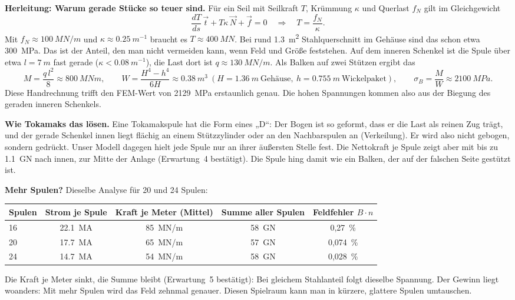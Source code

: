 \textbf{Herleitung: Warum gerade Stücke so teuer sind.} Für ein Seil mit Seilkraft $T$, Krümmung $\kappa$ und
Querlast $f_N$ gilt im Gleichgewicht
\[
\frac{dT}{ds}\,\vec t + T\kappa\,\vec N + \vec f = 0 \quad\Rightarrow\quad T = \frac{f_N}{\kappa}.
\]
Mit $f_N \approx \SI{100}{MN/m}$ und $\kappa \approx \SI{0,25}{m^{-1}}$ braucht es $T \approx \SI{400}{MN}$. Bei rund
\SI{1,3}{m^2} Stahlquerschnitt im Gehäuse sind das schon etwa \SI{300}{MPa}. Das ist der Anteil, den man nicht vermeiden
kann, wenn Feld und Größe feststehen. Auf dem inneren Schenkel ist die Spule über etwa $l = \SI{7}{m}$ fast gerade
($\kappa < \SI{0,08}{m^{-1}}$), die Last dort ist $q \approx \SI{130}{MN/m}$. Als Balken auf zwei Stützen ergibt das
\[
M = \frac{q\,l^2}{8} \approx \SI{800}{MNm},\qquad
W = \frac{H^4 - h^4}{6H} \approx \SI{0,38}{m^3}\ (H = \SI{1,36}{m}\ \text{Gehäuse},\ h = \SI{0,755}{m}\ \text{Wickelpaket}),
\qquad \sigma_B = \frac{M}{W} \approx \SI{2100}{MPa}.
\]
Diese Handrechnung trifft den FEM-Wert von \SI{2129}{MPa} erstaunlich genau. Die hohen Spannungen kommen also aus
der Biegung des geraden inneren Schenkels.

\textbf{Wie Tokamaks das lösen.} Eine Tokamakspule hat die Form eines „D“: Der Bogen ist so geformt, dass er die Last
als reinen Zug trägt, und der gerade Schenkel innen liegt flächig an einem Stützzylinder oder an den Nachbarspulen an
(Verkeilung). Er wird also nicht gebogen, sondern gedrückt. Unser Modell dagegen hielt jede Spule nur an ihrer
äußersten Stelle fest. Die Nettokraft je Spule zeigt aber mit bis zu \SI{1,1}{GN} nach innen, zur Mitte der Anlage
(Erwartung~4 bestätigt). Die Spule hing damit wie ein Balken, der auf der falschen Seite gestützt ist.

\textbf{Mehr Spulen?} Dieselbe Analyse für 20 und 24 Spulen:
\begin{center}\small
\begin{tabular}{lcccc}
\toprule
Spulen & Strom je Spule & Kraft je Meter (Mittel) & Summe aller Spulen & Feldfehler $B\cdot n$ \\
\midrule
16 & \SI{22,1}{MA} & \SI{85}{MN/m} & \SI{58}{GN} & 0,27~\% \\
20 & \SI{17,7}{MA} & \SI{65}{MN/m} & \SI{57}{GN} & 0,074~\% \\
24 & \SI{14,7}{MA} & \SI{54}{MN/m} & \SI{58}{GN} & 0,028~\% \\
\bottomrule
\end{tabular}
\end{center}
Die Kraft je Meter sinkt, die Summe bleibt (Erwartung~5 bestätigt): Bei gleichem Stahlanteil folgt dieselbe
Spannung. Der Gewinn liegt woanders: Mit mehr Spulen wird das Feld zehnmal genauer. Diesen Spielraum kann man in
kürzere, glattere Spulen umtauschen.

